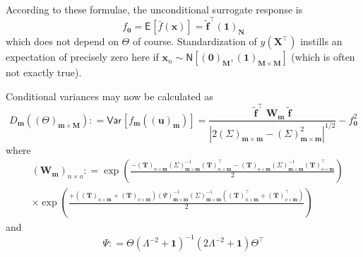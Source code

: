 \documentclass[preprint,12pt]{elsarticle}
\newcommand*{\M}[1]{\ensuremath{#1}\xspace}
\newcommand*{\vr}[1]{\M{\mathbf{#1}}}
\newcommand*{\deq}{\M{\mathrel{\mathop:}=}}
\newcommand*{\ev}[2][]{\mathsf{E}_{#1}\!\left\lbrack{} #2 \right\rbrack}
\newcommand*{\var}[2][]{\mathsf{Var}_{#1}\!\left\lbrack{} #2 \right\rbrack}
\newcommand*{\gauss}[2]{\mathsf{N}\!\left\lbrack{} #1 , #2 \right\rbrack}
\newcommand*{\modulus}[1]{\M{\left\lvert#1\right\rvert}}
\begin{document}
            According to these formulae, the unconditional surrogate response is
            \begin{equation} \label{eq:Method:GSA:f_0}
                f_{\vr{0}} = \ev{\bar{f}(\vr{x})} = \tilde{\vr{f}}^{\intercal} (\vr{1})_{\vr{N}}
            \end{equation}
            which does not depend on $\Theta$ of course. Standardization of $y(\vr{X}^{\intercal})$ instills an expectation of precisely zero here if $\vr{x}_{n} \sim \gauss{(\vr{0})_{\vr{M}}}{(\vr{1})_{\vr{M}\times\vr{M}}}$ (which is often not exactly true).

            Conditional variances may now be calculated as
            \begin{equation} \label{eq:Method:GSA:DmDef}
                D_{\vr{m}}((\Theta)_{\vr{m}\times\vr{M}}) \deq \var{f_{\vr{m}}((\vr{u})_{\vr{m}})}
                = \frac {\tilde{\vr{f}}^{\intercal} \; \vr{W}_{\vr{m}} \; \tilde{\vr{f}}}
                    {\modulus{2(\Sigma)_{\vr{m}\times\vr{m}} - (\Sigma)_{\vr{m}\times\vr{m}}^{2}}^{1/2}}
                - f_{\vr{0}}^{2}
            \end{equation}
            where
            \begin{equation} \label{eq:Method:GSA:WmDef}
                \begin{aligned}
                    &(\vr{W}_{\vr{m}})_{n \times o} \deq
                    \exp\!\left(\frac{
                        -(\vr{T})_{n\times\vr{m}}(\Sigma)_{\vr{m}\times\vr{m}}^{-1}
                        (\vr{T})_{n\times\vr{m}}^{\intercal} 
                        -(\vr{T})_{o\times\vr{m}}(\Sigma)_{\vr{m}\times\vr{m}}^{-1}
                        (\vr{T})_{o\times\vr{m}}^{\intercal}
                        }{2}\right) \\
                        &\times\exp\!\left(\frac{
                            + \left((\vr{T})_{n\times\vr{m}}+(\vr{T})_{o\times\vr{m}}\right)
                            (\Psi)_{\vr{m}\times\vr{m}}^{-1}(\Sigma)_{\vr{m}\times\vr{m}}^{-1}
                            \left((\vr{T})_{n\times\vr{m}}^{\intercal}+(\vr{T})_{o\times\vr{m}}^{\intercal}\right)
                            }{2}\right)
                \end{aligned}
            \end{equation}
            and
            \begin{equation} \label{eq:Method:GSA:PhiDef}
                \Psi \deq \Theta \left(\Lambda^{-2}+\vr{1}\right)^{-1}\left(2\Lambda^{-2}+\vr{1}\right) 
                \Theta^{\intercal}
            \end{equation}
\end{document}

